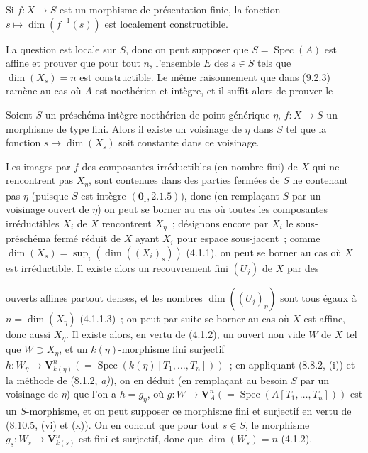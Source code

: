 \begin{proposition}[9.2.6.1]
\label{IV.9.2.6.1-fr}
Si $f:X\to S$ est un morphisme de présentation finie, la fonction
$s\mapsto\dim(f^{-1}(s))$ est localement constructible.
\end{proposition}

La question est locale sur $S$, donc on peut supposer que
$S=\operatorname{Spec}(A)$ est affine et prouver que pour tout $n$, l'ensemble
$E$ des $s\in S$ tels que $\dim(X_s)=n$ est constructible. Le même
raisonnement que dans (9.2.3) ramène au cas où $A$ est noethérien et intègre,
et il suffit alors de prouver le

\begin{corollary}[9.2.6.2]
\label{IV.9.2.6.2-fr}
Soient $S$ un préschéma intègre noethérien de point générique $\eta$,
$f:X\to S$ un morphisme de type fini. Alors il existe un voisinage de $\eta$
dans $S$ tel que la fonction $s\mapsto\dim(X_s)$ soit constante dans ce
voisinage.
\end{corollary}

Les images par $f$ des composantes irréductibles (en nombre fini) de $X$ qui
ne rencontrent pas $X_\eta$, sont contenues dans des parties fermées de $S$ ne
contenant pas $\eta$ (puisque $S$ est intègre
$(\mathbf 0_{\mathrm I},2.1.5)$), donc (en remplaçant $S$ par un voisinage
ouvert de $\eta$) on peut se borner au cas où toutes les composantes
irréductibles $X_i$ de $X$ rencontrent $X_\eta$~; désignons encore par $X_i$
le sous-préschéma fermé réduit de $X$ ayant $X_i$ pour espace sous-jacent~;
comme $\dim(X_s)=\sup_i(\dim((X_i)_s))$ (4.1.1), on peut se borner au cas où
$X$ est irréductible. Il existe alors un recouvrement fini $(U_j)$ de $X$ par
des

ouverts affines partout denses, et les nombres $\dim((U_j)_\eta)$ sont tous
égaux à $n=\dim(X_\eta)$ (4.1.1.3)~; on peut par suite se borner au cas où $X$
est affine, donc aussi $X_\eta$. Il existe alors, en vertu de (4.1.2), un
ouvert non vide $W$ de $X$ tel que $W\supset X_\eta$, et un
$k(\eta)$-morphisme fini surjectif
$h:W_\eta\to\mathbf V_{k(\eta)}^n
(=\operatorname{Spec}(k(\eta)[T_1,\ldots,T_n]))$~; en appliquant
(8.8.2, (i)) et la méthode de (8.1.2, \emph{a)}), on en déduit (en remplaçant
au besoin $S$ par un voisinage de $\eta$) que l'on a $h=g_\eta$, où
$g:W\to\mathbf V_A^n(=\operatorname{Spec}(A[T_1,\ldots,T_n]))$ est un
$S$-morphisme, et on peut supposer ce morphisme fini et surjectif en vertu de
(8.10.5, (vi) et (x)). On en conclut que pour tout $s\in S$, le morphisme
$g_s:W_s\to\mathbf V_{k(s)}^n$ est fini et surjectif, donc que
$\dim(W_s)=n$ (4.1.2).

